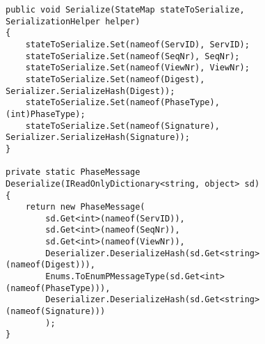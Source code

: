 \begin{figure}[H]
	\centering
	\lstset{style=sharpc}
	\begin{lstlisting}[label = code:seriadeseria, caption=Serialize/Deserialize code example, captionpos=b, basicstyle=\scriptsize]
public void Serialize(StateMap stateToSerialize, SerializationHelper helper)
{
    stateToSerialize.Set(nameof(ServID), ServID);
    stateToSerialize.Set(nameof(SeqNr), SeqNr);
    stateToSerialize.Set(nameof(ViewNr), ViewNr);
    stateToSerialize.Set(nameof(Digest), Serializer.SerializeHash(Digest));
    stateToSerialize.Set(nameof(PhaseType), (int)PhaseType);
    stateToSerialize.Set(nameof(Signature), Serializer.SerializeHash(Signature));
}

private static PhaseMessage Deserialize(IReadOnlyDictionary<string, object> sd)
{
    return new PhaseMessage(
        sd.Get<int>(nameof(ServID)),
        sd.Get<int>(nameof(SeqNr)),
        sd.Get<int>(nameof(ViewNr)),
        Deserializer.DeserializeHash(sd.Get<string>(nameof(Digest))),
        Enums.ToEnumPMessageType(sd.Get<int>(nameof(PhaseType))),
        Deserializer.DeserializeHash(sd.Get<string>(nameof(Signature)))
        );
}
	\end{lstlisting}
\end{figure}